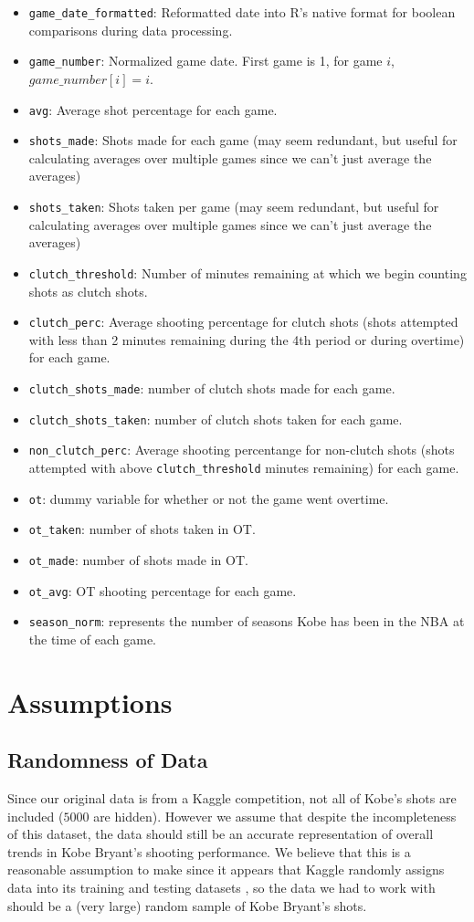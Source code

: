 \documentclass[paper=a4, fontsize=11pt]{scrartcl} %
\numberwithin{equation}{section} %
\numberwithin{figure}{section} %
\numberwithin{table}{section} %
\begin{document}
\begin{itemize}
	\item \texttt{game\_date\_formatted}: Reformatted date into R's native format for boolean comparisons during data processing. 
	\item \texttt{game\_number}: Normalized game date. First game is 1, for game $i$, $game\_number[i] = i$.
	\item \texttt{avg}: Average shot percentage for each game.
	\item \texttt{shots\_made}: Shots made for each game (may seem redundant, but useful for calculating averages over multiple games since we can't just average the averages)
	\item \texttt{shots\_taken}: Shots taken per game (may seem redundant, but useful for calculating averages over multiple games since we can't just average the averages)
	\item \texttt{clutch\_threshold}: Number of minutes remaining at which we begin counting shots as clutch shots.
	\item \texttt{clutch\_perc}: Average shooting percentage for clutch shots (shots attempted with less than 2 minutes remaining during the 4th period or during overtime) for each game.
	\item \texttt{clutch\_shots\_made}: number of clutch shots made for each game.
	\item \texttt{clutch\_shots\_taken}: number of clutch shots taken for each game. 
	\item \texttt{non\_clutch\_perc}: Average shooting percentange for non-clutch shots (shots attempted with above \texttt{clutch\_threshold} minutes remaining) for each game. 
	\item \texttt{ot}: dummy variable for whether or not the game went overtime.
	\item \texttt{ot\_taken}: number of shots taken in OT.
	\item \texttt{ot\_made}: number of shots made in OT.
	\item \texttt{ot\_avg}: OT shooting percentage for each game.
	\item \texttt{season\_norm}: represents the number of seasons Kobe has been in the NBA at the time of each game.

	\end{itemize}
\section{Assumptions}
\subsection{Randomness of Data}
\hspace*{1cm}Since our original data is from a Kaggle competition, not all of Kobe's shots are included ($5000$ are hidden). However we assume that despite the incompleteness of this dataset, the data should still be an accurate representation of overall trends in Kobe Bryant's shooting performance. We believe that this is a reasonable assumption to make since it appears that Kaggle randomly assigns data into its training and testing datasets \cite{forumpost}, so the data we had to work with should be a (very large) random sample of Kobe Bryant's shots.
\end{document}
